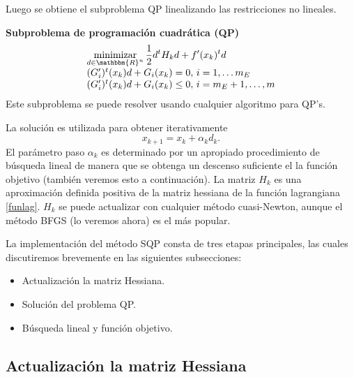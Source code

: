 \documentclass[a4paper,10pt]{book}
\newcommand{\R}{\mathbbm{R}}
\newcommand{\Rn}{\R^n}
\newcommand{\la}{\langle}
\newcommand{\ra}{\rangle}
\begin{document}
Luego se obtiene el subproblema QP linealizando las restricciones no lineales.


\textbf{Subproblema de programación cuadrática (QP)}
\begin{equation}\label{QP}
\begin{array}{ll}
    \displaystyle \mathop{\mathrm{minimizar}}_{d\in\Rn}\frac{1}{2}d^tH_kd+f'(x_k)^td\\
    (G_i')^t(x_k)d+G_i(x_k)=0,\, i=1,\ldots m_E\\
    (G_i')^t(x_k)d+G_i(x_k)\leq0,\, i=m_E+1,\ldots,m
\end{array}
\end{equation}
Este subproblema se puede resolver usando cualquier algoritmo para QP's.

La solución es utilizada para obtener iterativamente $$x_{k+1}=x_k+\alpha_kd_k.$$
El parámetro paso $\alpha_k$ es determinado por un apropiado procedimiento de búsqueda lineal de manera que se obtenga un descenso suficiente el la función objetivo (también veremos esto a continuación). La matriz $H_k$ es una aproximación definida positiva de la matriz hessiana de la función lagrangiana \eqref{funlag}. $H_k$ se puede actualizar con cualquier método cuasi-Newton, aunque el método BFGS (lo veremos ahora) es el más popular.

La implementación del método SQP consta de tres etapas principales, las cuales discutiremos brevemente en las siguientes subsecciones:
\begin{itemize}
    \item Actualización la matriz Hessiana.
    \item Solución del problema QP.
    \item Búsqueda lineal y función objetivo.
\end{itemize}

\subsection{Actualización la matriz Hessiana}
\end{document}
